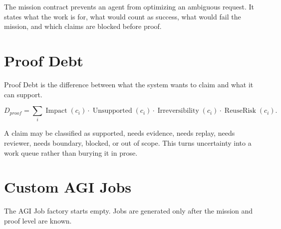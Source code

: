 \documentclass[11pt]{article}
\begin{document}
The mission contract prevents an agent from optimizing an ambiguous request. It states what the work is for, what would count as success, what would fail the mission, and which claims are blocked before proof.

\section{Proof Debt}
Proof Debt is the difference between what the system wants to claim and what it can support.

\begin{equation}
D_{proof}=\sum_i \operatorname{Impact}(c_i)\cdot \operatorname{Unsupported}(c_i)\cdot \operatorname{Irreversibility}(c_i)\cdot \operatorname{ReuseRisk}(c_i).
\end{equation}

A claim may be classified as supported, needs evidence, needs replay, needs reviewer, needs boundary, blocked, or out of scope. This turns uncertainty into a work queue rather than burying it in prose.

\section{Custom AGI Jobs}
The AGI Job factory starts empty. Jobs are generated only after the mission and proof level are known.
\end{document}
